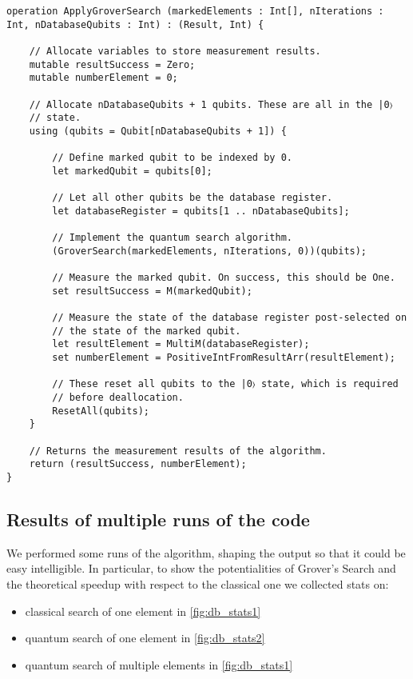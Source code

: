 \begin{lstlisting}
operation ApplyGroverSearch (markedElements : Int[], nIterations : Int, nDatabaseQubits : Int) : (Result, Int) {
	
	// Allocate variables to store measurement results.
	mutable resultSuccess = Zero;
	mutable numberElement = 0;
	
	// Allocate nDatabaseQubits + 1 qubits. These are all in the |0〉
	// state.
	using (qubits = Qubit[nDatabaseQubits + 1]) {
		
		// Define marked qubit to be indexed by 0.
		let markedQubit = qubits[0];
		
		// Let all other qubits be the database register.
		let databaseRegister = qubits[1 .. nDatabaseQubits];
		
		// Implement the quantum search algorithm.
		(GroverSearch(markedElements, nIterations, 0))(qubits);
		
		// Measure the marked qubit. On success, this should be One.
		set resultSuccess = M(markedQubit);
		
		// Measure the state of the database register post-selected on
		// the state of the marked qubit.
		let resultElement = MultiM(databaseRegister);
		set numberElement = PositiveIntFromResultArr(resultElement);
		
		// These reset all qubits to the |0〉 state, which is required
		// before deallocation.
		ResetAll(qubits);
	}
	
	// Returns the measurement results of the algorithm.
	return (resultSuccess, numberElement);
}
\end{lstlisting}

\subsection{Results of multiple runs of the code}

We performed some runs of the algorithm, shaping the output so that it could be easy intelligible. In particular, to show the potentialities of Grover's Search and the theoretical speedup with respect to the classical one we collected stats on:
\begin{itemize}
	\item classical search of one element in \cref{fig:db_stats1}
	\item quantum search of one element in \cref{fig:db_stats2}
	\item quantum search of multiple elements in \cref{fig:db_stats1}
\end{itemize}

